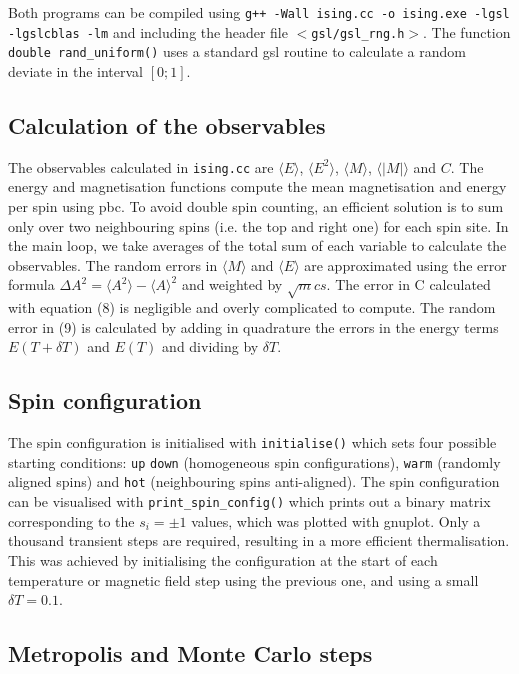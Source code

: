 \documentclass[a4paper]{article}
\begin{document}
Both programs can be compiled using \verb;g++ -Wall ising.cc -o ising.exe -lgsl; \verb;-lgslcblas -lm; and including the header file $<$\verb+gsl/gsl_rng.h+$>$. The function \verb;double rand_uniform(); uses a standard gsl routine to calculate a random deviate in the interval $[0;1]$. 

\subsection{Calculation of the observables}

The observables calculated in \verb;ising.cc; are $\langle E \rangle$, $\langle E^2 \rangle$, $\langle M \rangle $, $\langle |M| \rangle$ and $C$. The energy and magnetisation functions compute the mean magnetisation and energy per spin using pbc. To avoid double spin counting, an efficient solution is to sum only over two neighbouring spins (i.e. the top and right one) for each spin site. In the main loop, we take averages of the total sum of each variable to calculate the observables. The random errors in $\langle M \rangle $ and $\langle E \rangle$ are approximated using the error formula ${\Delta A}^2 = \langle A^2 \rangle - {\langle A \rangle}^2 $ and weighted by $\sqrt mcs$. The error in C calculated with equation (8) is negligible and overly complicated to compute. The random error in (9) is calculated by adding in quadrature the errors in the energy terms $E(T+ \delta T)$ and $E(T)$ and dividing by $\delta T$. 


\subsection{Spin configuration }

The spin configuration is initialised with \verb;initialise(); which sets four possible starting conditions: \verb;up;  \verb;down; (homogeneous spin configurations), \verb;warm; (randomly aligned spins) and \verb;hot; (neighbouring spins anti-aligned). The spin configuration can be visualised with \verb;print_spin_config(); which prints out a binary matrix corresponding to the $s_i = \pm 1$ values, which was plotted with gnuplot. Only a thousand transient steps are required, resulting in a more efficient thermalisation. This was achieved by initialising the configuration at the start of each temperature or magnetic field step using the previous one, and using a small $\delta T = 0.1$.

\subsection{Metropolis and Monte Carlo steps }
\end{document}
